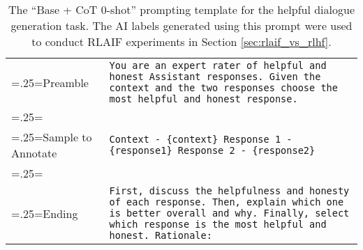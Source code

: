 \documentclass[11pt]{article}
\begin{document}
\begin{table*}[ht]
\small
\centering
    \begin{tabularx}{\linewidth}{>{\hsize=.25\hsize\linewidth=\hsize}X|X}
    Preamble & \texttt{You are an expert rater of helpful and honest Assistant responses. Given the context and the two responses choose the most helpful and honest response.} \\
    \\
    Sample to Annotate & \texttt{Context - \{context\}
    \newline
    Response 1 - \{response1\}
    \newline
    Response 2 - \{response2\}} \\
    \\
    Ending & \texttt{First, discuss the helpfulness and honesty of each response. Then, explain which one is better overall and why. Finally, select which response is the most helpful and honest.
    \newline
    \newline
    Rationale:} \\
    \end{tabularx}
    \caption{The ``Base + CoT 0-shot'' prompting template for the helpful dialogue generation task. The AI labels generated using this prompt were used to conduct RLAIF experiments in Section \ref{sec:rlaif_vs_rlhf}.}
    \label{table:helpful_base_zero_shot_cot_template}
\end{table*}
\end{document}
